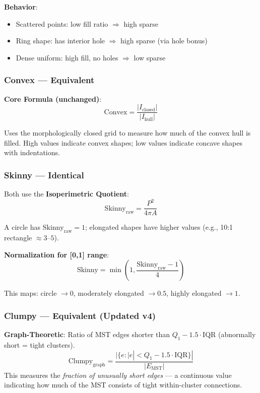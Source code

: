 \documentclass[11pt]{article}
\begin{document}
\textbf{Behavior}:
\begin{itemize}
    \item Scattered points: low fill ratio $\Rightarrow$ high sparse
    \item Ring shape: has interior hole $\Rightarrow$ high sparse (via hole bonus)
    \item Dense uniform: high fill, no holes $\Rightarrow$ low sparse
\end{itemize}

\subsubsection{Convex — \textcolor{equivalent}{Equivalent}}

\textbf{Core Formula (unchanged)}:
\begin{equation}
    \text{Convex} = \frac{|I_{\text{closed}}|}{|I_{\text{hull}}|}
\end{equation}

Uses the morphologically closed grid to measure how much of the convex hull is filled. High values indicate convex shapes; low values indicate concave shapes with indentations.

\subsubsection{Skinny — \textcolor{equivalent}{Identical}}

Both use the \textbf{Isoperimetric Quotient}:
\begin{equation}
    \text{Skinny}_{\text{raw}} = \frac{P^2}{4\pi A}
\end{equation}

A circle has $\text{Skinny}_{\text{raw}} = 1$; elongated shapes have higher values (e.g., 10:1 rectangle $\approx 3$--$5$).

\textbf{Normalization for [0,1] range}:
\begin{equation}
    \text{Skinny} = \min\left(1, \frac{\text{Skinny}_{\text{raw}} - 1}{4}\right)
\end{equation}

This maps: circle $\to 0$, moderately elongated $\to 0.5$, highly elongated $\to 1$.

\subsubsection{Clumpy — \textcolor{equivalent}{Equivalent} (Updated v4)}

\textbf{Graph-Theoretic}: Ratio of MST edges shorter than $Q_1 - 1.5 \cdot \text{IQR}$ (abnormally short = tight clusters).
\begin{equation}
    \text{Clumpy}_{\text{graph}} = \frac{|\{e : |e| < Q_1 - 1.5 \cdot \text{IQR}\}|}{|E_{\text{MST}}|}
\end{equation}
This measures the \textit{fraction of unusually short edges} — a continuous value indicating how much of the MST consists of tight within-cluster connections.
\end{document}

